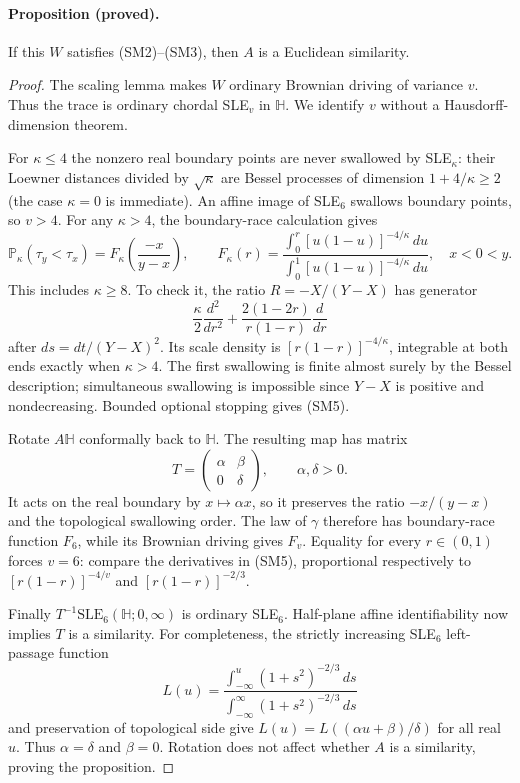 \documentclass[11pt]{article}
\theoremstyle{definition}\newtheorem{definition}[theorem]{Definition}
\theoremstyle{remark}\newtheorem{remark}[theorem]{Remark}
\begin{document}
\paragraph{Proposition (proved).}
If this $W$ satisfies (SM2)--(SM3), then $A$ is a Euclidean similarity.

\begin{proof}
The scaling lemma makes $W$ ordinary Brownian driving of variance $v$.
Thus the trace is ordinary chordal SLE$_v$ in $\mathbb H$.
We identify $v$ without a Hausdorff-dimension theorem.

For $\kappa\leq4$ the nonzero real boundary points are never swallowed by
SLE$_\kappa$: their Loewner distances divided by $\sqrt\kappa$ are Bessel
processes of dimension $1+4/\kappa\geq2$ (the case $\kappa=0$ is immediate).
An affine image of SLE$_6$ swallows boundary points, so $v>4$.
For any $\kappa>4$, the boundary-race calculation gives
\[
 \mathbb P_\kappa(\tau_y<\tau_x)
 =F_\kappa\!\left(\frac{-x}{y-x}\right),\qquad
 F_\kappa(r)=
 \frac{\displaystyle\int_0^r[u(1-u)]^{-4/\kappa}\,du}
 {\displaystyle\int_0^1[u(1-u)]^{-4/\kappa}\,du},
 \quad x<0<y.
 \tag{SM5}
\]
This includes $\kappa\geq8$.  To check it, the ratio
$R=-X/(Y-X)$ has generator
\[
 \frac\kappa2\frac{d^2}{dr^2}
   +\frac{2(1-2r)}{r(1-r)}\frac d{dr}
\]
after $ds=dt/(Y-X)^2$.  Its scale density is
$[r(1-r)]^{-4/\kappa}$, integrable at both ends exactly when $\kappa>4$.
The first swallowing is finite almost surely by the Bessel description;
simultaneous swallowing is impossible since $Y-X$ is positive and
nondecreasing.  Bounded optional stopping gives (SM5).

Rotate $A\mathbb H$ conformally back to $\mathbb H$.  The resulting map
has matrix
\[
 T=\begin{pmatrix}\alpha&\beta\\0&\delta\end{pmatrix},
 \qquad \alpha,\delta>0.
\]
It acts on the real boundary by $x\mapsto\alpha x$, so it preserves the
ratio $-x/(y-x)$ and the topological swallowing order.  The law of
$\gamma$ therefore has boundary-race function $F_6$, while its Brownian
driving gives $F_v$.  Equality for every $r\in(0,1)$ forces $v=6$:
compare the derivatives in (SM5), proportional respectively to
$[r(1-r)]^{-4/v}$ and $[r(1-r)]^{-2/3}$.

Finally $T^{-1}\mathrm{SLE}_6(\mathbb H;0,\infty)$ is ordinary SLE$_6$.
Half-plane affine identifiability now implies $T$ is a similarity.
For completeness, the strictly increasing SLE$_6$ left-passage function
\[
 L(u)=\frac{\int_{-\infty}^u(1+s^2)^{-2/3}\,ds}
 {\int_{-\infty}^{\infty}(1+s^2)^{-2/3}\,ds}
\]
and preservation of topological side give
$L(u)=L((\alpha u+\beta)/\delta)$ for all real $u$.
Thus $\alpha=\delta$ and $\beta=0$.  Rotation does not affect whether $A$
is a similarity, proving the proposition.
\end{proof}
\end{document}
